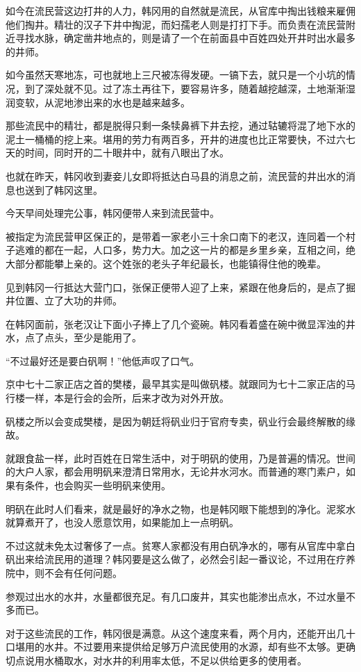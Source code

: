 如今在流民营这边打井的人力，韩冈用的自然就是流民，从官库中掏出钱粮来雇佣他们掏井。精壮的汉子下井中掏泥，而妇孺老人则是打打下手。而负责在流民营附近寻找水脉，确定凿井地点的，则是请了一个在前面县中百姓四处开井时出水最多的井师。

如今虽然天寒地冻，可也就地上三尺被冻得发硬。一镐下去，就只是一个小坑的情况，到了深处就不见。过了冻土再往下，要容易许多，随着越挖越深，土地渐渐湿润变软，从泥地渗出来的水也是越来越多。

那些流民中的精壮，都是脱得只剩一条犊鼻裤下井去挖，通过轱辘将混了地下水的泥土一桶桶的挖上来。堪用的劳力有两百多，开井的进度也比正常要快，不过六七天的时间，同时开的二十眼井中，就有八眼出了水。

也就在昨天，韩冈收到妻妾儿女即将抵达白马县的消息之前，流民营的井出水的消息也送到了韩冈这里。

今天早间处理完公事，韩冈便带人来到流民营中。

被指定为流民营甲区保正的，是带着一家老小三十余口南下的老汉，连同着一个村子逃难的都在一起，人口多，势力大。加之这一片的都是乡里乡亲，互相之间，绝大部分都能攀上亲的。这个姓张的老头子年纪最长，也能镇得住他的晚辈。

见到韩冈一行抵达大营门口，张保正便带人迎了上来，紧跟在他身后的，是点了掘井位置、立了大功的井师。

在韩冈面前，张老汉让下面小子捧上了几个瓷碗。韩冈看着盛在碗中微显浑浊的井水，点了点头，至少是能用了。

“不过最好还是要白矾啊！”他低声叹了口气。

京中七十二家正店之首的樊楼，最早其实是叫做矾楼。就跟同为七十二家正店的马行楼一样，本是行会的会所，后来才改为对外开放。

矾楼之所以会变成樊楼，是因为朝廷将矾业归于官府专卖，矾业行会最终解散的缘故。

就跟食盐一样，此时百姓在日常生活中，对于明矾的使用，乃是普遍的情况。世间的大户人家，都会用明矾来澄清日常用水，无论井水河水。而普通的寒门素户，如果有条件，也会购买一些明矾来使用。

明矾在此时人们看来，就是最好的净水之物，也是韩冈眼下能想到的净化。泥浆水就算煮开了，也没人愿意饮用，如果能加上一点明矾。

不过这就未免太过奢侈了一点。贫寒人家都没有用白矾净水的，哪有从官库中拿白矾出来给流民用的道理？韩冈要是这么做了，必然会引起一番议论，不过用在疗养院中，则不会有任何问题。

参观过出水的水井，水量都很充足。有几口废井，其实也能渗出点水，不过水量不多而已。

对于这些流民的工作，韩冈很是满意。从这个速度来看，两个月内，还能开出几十口堪用的水井。不过要用来提供给足够万户流民使用的水源，却有些不太够。更确切点说用水桶取水，对水井的利用率太低，不足以供给更多的使用者。

